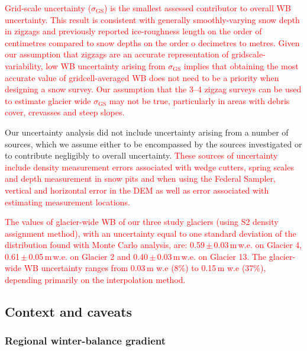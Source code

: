 \documentclass[twocolumn, letterpaper]{igs}
\begin{document}
\textcolor{red}{Grid-scale uncertainty ($\sigma_{\mathrm{GS}}$) is the smallest assessed contributor to overall WB uncertainty. This result is consistent with generally smoothly-varying snow depth in zigzags and previously reported ice-roughness length on the order of centimetres \citep[e.g.][]{Hock2005} compared to snow depths on the order o decimetres to metres. Given our assumption that zigzags are an accurate representation of gridscale-variability, low WB uncertainty arising from $\sigma_{\mathrm{GS}}$ implies that obtaining the most accurate value of gridcell-averaged WB does not need to be a priority when designing a snow survey. Our assumption that the 3--4 zigzag surveys can be used to estimate glacier wide $\sigma_{\mathrm{GS}}$ may not be true, particularly in areas with debris cover, crevasses and steep slopes.}

Our uncertainty analysis did not include uncertainty arising from a number of sources, which we assume either to be  encompassed by the sources investigated or to contribute negligibly to overall uncertainty. \textcolor{red}{These sources of uncertainty include density measurement errors associated with wedge cutters, spring scales and depth measurement in snow pits and when using the Federal Sampler, vertical and horizontal error in the DEM as well as error associated with estimating measurement locations.}

\textcolor{red}{The values of glacier-wide WB of our three study glaciers (using S2 density assignment method), with an uncertainty equal to one standard deviation of the distribution found with Monte Carlo analysis, are: 0.59\,$\pm$\,0.03\,m\,w.e. on Glacier 4, 0.61\,$\pm$\,0.05\,m\,w.e. on Glacier 2 and 0.40\,$\pm$\,0.03\,m\,w.e. on Glacier 13. The glacier-wide WB uncertainty ranges from 0.03\,m w.e (8\%) to 0.15\,m w.e (37\%), depending primarily on the interpolation method.}

\subsection{Context and caveats}
\subsubsection{Regional winter-balance gradient}
\end{document}
